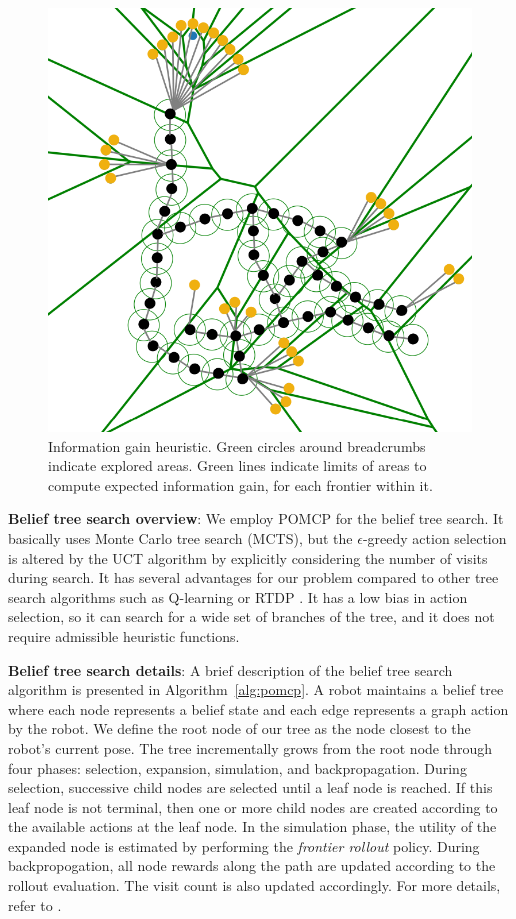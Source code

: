 \documentclass[letterpaper, 10 pt, conference]{ieeeconf}  %
\newcommand{\ph}[1]{{\textbf{#1}:}} %
\begin{document}
\begin{figure}[ht!]
  \includegraphics[width=.45\textwidth]{figures/irm_voronoi_combined.png}  \caption{Information gain heuristic.  Green circles around breadcrumbs indicate explored areas.  Green lines indicate limits of areas to compute expected information gain, for each frontier within it.}
  \label{fig:info_heuristic}
\end{figure}

\ph{Belief tree search overview}
We employ POMCP \cite{silver2010monte} for the belief tree search.
It basically uses Monte Carlo tree search (MCTS), but the $\epsilon$-greedy action selection is altered by the UCT algorithm by explicitly considering the number of visits during search.
It has several advantages for our problem compared to other tree search algorithms such as Q-learning \cite{watkins1992q} or RTDP \cite{barto1995learning}.
It has a low bias in action selection, so it can search for a wide set of branches of the tree, and it does not require admissible heuristic functions. %

\ph{Belief tree search details}
A brief description of the belief tree search algorithm is presented in Algorithm~\ref{alg:pomcp}.
A robot maintains a belief tree where each node represents a belief state and each edge represents a graph action by the robot. We define the root node of our tree as the node closest to the robot's current pose. The tree incrementally grows from the root node through four phases: selection, expansion, simulation, and backpropagation. During selection, successive child nodes are selected until a leaf node is reached. If this leaf node is not terminal, then one or more child nodes are created according to the available actions at the leaf node. In the simulation phase, the utility of the expanded node is estimated by performing the \emph{frontier rollout} policy. During backpropogation, all node rewards along the path are updated according to the rollout evaluation. The visit count is also updated accordingly. For more details, refer to \cite{silver2010monte}.
\end{document}
